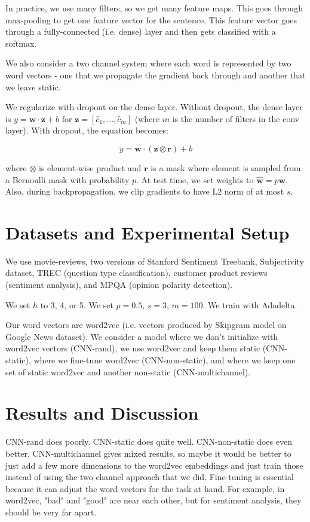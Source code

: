 \documentclass[a4paper]{article}
\begin{document}
In practice, we use many filters, so we get many feature maps. This goes
through max-pooling to get one feature vector for the sentence. This
feature vector goes through a fully-connected (i.e. dense) layer and
then gets classified with a softmax.

We also consider a two channel system where each word is represented by two
word vectors - one that we propagate the gradient back through and another
that we leave static.

We regularize with dropout on the dense layer. Without dropout, the dense
layer is $y = \mathbf{w} \cdot \mathbf{z} + b$ for $\mathbf{z} = [\hat{c}_1,
..., \hat{c}_m]$ (where $m$ is the number of filters in the conv layer).
With dropout, the equation becomes:

$$
y = \mathbf{w} \cdot (\mathbf{z} \otimes \mathbf{r}) + b
$$

where $\otimes$ is element-wise product and $\mathbf{r}$ is a mask where
element is sampled from a Bernoulli mask with probability $p$. At test time,
we set weights to $\hat{\mathbf{w}} = p \mathbf{w}$. Also, during
backpropagation, we clip gradients to have L2 norm of at most $s$.

\section{Datasets and Experimental Setup}
We use movie-reviews, two versions of Stanford Sentiment Treebank,
Subjectivity dataset, TREC (question type classification), customer product
reviews (sentiment analysis), and MPQA (opinion polarity detection).

We set $h$ to 3, 4, or 5. We set $p = 0.5$, $s = 3$, $m = 100$. We train
with Adadelta.

Our word vectors are word2vec (i.e. vectors produced by Skipgram model on
Google News dataset). We consider a model where we don't initialize with
word2vec vectors (CNN-rand), we use word2vec and keep them static (CNN-static),
where we fine-tune word2vec (CNN-non-static), and where we keep one set of
static word2vec and another non-static (CNN-multichannel).

\section{Results and Discussion}
CNN-rand does poorly. CNN-static does quite well. CNN-non-static does even
better. CNN-multichannel gives mixed results, so maybe it would be better
to just add a few more dimensions to the word2vec embeddings and just train
those instead of using the two channel approach that we did. Fine-tuning is
essential because it can adjust the word vectors for the task at hand. For
example, in word2vec, "bad" and "good" are near each other, but for sentiment
analysis, they should be very far apart.
\end{document}
